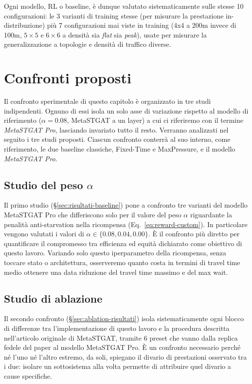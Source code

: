 Ogni modello, RL o baseline, è dunque valutato sistematicamente sulle
stesse 10 configurazioni: le 3 varianti di training stesse (per misurare la
prestazione in-distribuzione) più 7 configurazioni mai viste in training
(4x4 a 200m invece di 100m, $5\times5$ e $6\times6$ a densità sia
\emph{flat} sia \emph{peak}), usate per misurare la generalizzazione a
topologie e densità di traffico diverse.

\section{Confronti proposti}
\label{sec:confronti}

Il confronto sperimentale di questo capitolo è organizzato in tre studi indipendenti.
Ognuno di essi isola un solo asse di variazione rispetto al
modello di riferimento ($\alpha=0.08$, MetaSTGAT a un layer) a cui ci riferiremo con il termine \emph{MetaSTGAT Pro},
lasciando invariato tutto il resto. Verranno analizzati nel seguito i tre studi proposti.
Ciascun confronto conterrà al suo interno, come riferimento, le due baseline classiche, Fixed-Time e MaxPressure, e il modello \emph{MetaSTGAT Pro}.

\subsection{Studio del peso \texorpdfstring{$\alpha$}{alpha}}

Il primo studio (§\ref{sec:risultati-baseline}) pone a confronto tre varianti del
modello MetaSTGAT Pro che differiscono solo per il valore del peso $\alpha$ riguardante la penalità anti-starvation
nella ricompensa (Eq.~\ref{eq:reward-custom}).
In particolare vengono valutati i valori di $\alpha \in \{0.08, 0.04, 0.00\}$.
È il confronto più diretto per quantificare il compromesso tra efficienza ed
equità dichiarato come obiettivo di questo lavoro.
Variando solo questo iperparametro della ricompensa, senza toccare stato o architettura,
osserveremo quanto costa in termini di travel time medio ottenere una data riduzione del travel time massimo e del max wait.

\subsection{Studio di ablazione}

Il secondo confronto (§\ref{sec:ablation-risultati}) isola sistematicamente ogni blocco di differenze
tra l'implementazione di questo lavoro e la procedura
descritta nell'articolo originale di MetaSTGAT, tramite 6 preset che
vanno dalla replica fedele del paper al modello MetaSTGAT Pro.
È un confronto necessario perché né l'uno né l'altro estremo, da soli,
spiegano il divario di prestazioni osservato tra i due: isolare un
sottosistema alla volta permette di attribuire quel divario a cause specifiche.

